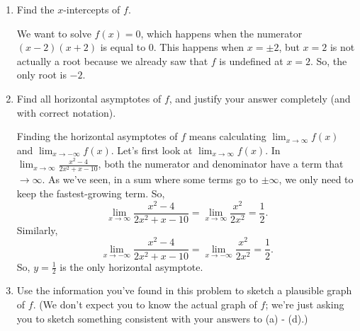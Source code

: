 \documentclass{article}
\theoremstyle{theorem}
\begin{document}
\begin{enumerate}
\begin{enumerate}
  \item
    \begin{problem}[\nstretch{0.25}]
      Find the $x$-intercepts of $f$.
    \end{problem}

    \begin{solution}
      We want to solve $f(x) = 0$, which happens when the numerator $(x-2)(x+2)$ is equal to 0. This happens when $x = \pm 2$, but $x = 2$ is not actually a root because we already saw that $f$ is undefined at $x = 2$. So, the only root is $\boxed{-2}$.
    \end{solution}

  \item 
    \begin{problem}[\vfill]
      Find all horizontal asymptotes of $f$, and justify your answer completely (and with correct notation). 
    \end{problem}

    \begin{solution}
      Finding the horizontal asymptotes of $f$ means calculating $\displaystyle \lim_{x \to \infty} f(x)$ and $\displaystyle \lim_{x \to -\infty} f(x)$. Let's first look at $\displaystyle \lim_{x \to \infty} f(x)$. In $\displaystyle \lim_{x \to \infty} \frac{x^2 - 4}{2x^2 + x - 10}$, both the numerator and denominator have a term that $\to \infty$. As we've seen, in a sum where some terms go to $\pm \infty$, we only need to keep the fastest-growing term. So,
      \[ \lim_{x \to \infty} \frac{x^2 - 4}{2x^2 + x - 10} = \lim_{x \to \infty} \frac{x^2}{2x^2} = \frac{1}{2}.\] Similarly,
      \[ \lim_{x \to -\infty} \frac{x^2 - 4}{2x^2 + x - 10} = \lim_{x \to -\infty} \frac{x^2}{2x^2} = \frac{1}{2}.\] So, $\boxed{y = \frac{1}{2}}$ is the only horizontal asymptote.
    \end{solution}

  \item
    \begin{problem}[\vfill\newpage]
      Use the information you've found in this problem to sketch a plausible graph of $f$. (We don't expect you to know the actual graph of $f$; we're just asking you to sketch something consistent with your answers to (a) - (d).) 
    \end{problem}


\end{enumerate}
\end{enumerate}
\end{document}
